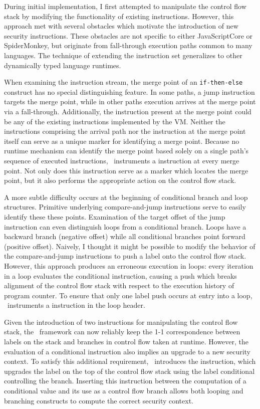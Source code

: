 During initial implementation, I first attempted to manipulate the control flow stack by modifying the functionality of existing instructions.
However, this approach met with several obstacles which motivate the introduction of new security instructions.
These obstacles are not specific to either JavaScriptCore or SpiderMonkey, but originate from fall-through execution paths common to many languages.
The technique of extending the instruction set generalizes to other dynamically typed language runtimes.

When examining the instruction stream, the merge point of an \texttt{if-then-else} construct has no special distinguishing feature.
In some paths, a jump instruction targets the merge point, while in other paths execution arrives at the merge point via a fall-through.
Additionally, the instruction present at the merge point could be any of the existing instructions implemented by the VM.
Neither the instructions comprising the arrival path nor the instruction at the merge point itself can serve as a unique marker for identifying a merge point.
Because no runtime mechanism can identify the merge point based solely on a single path's sequence of executed instructions, \FlowCore\ instruments a \popj instruction at every merge point.
Not only does this instruction serve as a marker which locates the merge point, but it also performs the appropriate action on the control flow stack.

A more subtle difficulty occurs at the beginning of conditional branch and loop structures.
Primitive underlying compare-and-jump instructions serve to easily identify these these points.
Examination of the target offset of the jump instruction can even distinguish loops from a conditional branch.
Loops have a backward branch (negative offset) while all conditional branches point forward (positive offset).
Naively, I thought it might be possible to modify the behavior of the compare-and-jump instructions to push a label onto the control flow stack.
However, this approach produces an erroneous execution in loops: every iteration in a loop evaluates the conditional instruction, causing a push which breaks alignment of the control flow stack with respect to the execution history of program counter.
To ensure that only one label push occurs at entry into a loop, \FlowCore\ instruments a \dup instruction in the loop header.

Given the introduction of two instructions for manipulating the control flow stack, the \FlowCore\ framework can now reliably keep the 1-1 correspondence between labels on the stack and branches in control flow taken at runtime.
However, the evaluation of a conditional instruction also implies an upgrade to a new security context.
To satisfy this additional requirement, \FlowCore\ introduces the \join instruction, which upgrades the label on the top of the control flow stack using the label conditional controlling the branch.
Inserting this instruction between the computation of a conditional value and its use as a control flow branch allows both looping and branching constructs to compute the correct security context.

